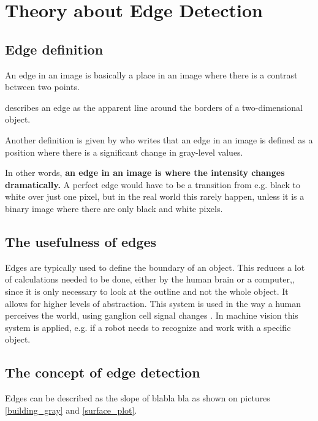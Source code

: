 \chapter{Theory about Edge Detection}
\section{Edge definition}
An edge in an image is basically a place in an image where there is a contrast between two points.

\citet{visual_story} describes an edge as the apparent line around the borders of a two-dimensional object.

Another definition is given by \citep{ip_book} who writes that an edge in an image is defined as a position where there is a significant change in gray-level values.

In other words, \textbf{an edge in an image is where the intensity changes dramatically.} A perfect edge would have to be a transition from e.g. black to white over just one pixel, but in the real world this rarely happen, unless it is a binary image where there are only black and white pixels.

\section{The usefulness of edges}
Edges are typically used to define the boundary of an object. This reduces a lot of calculations needed to be done, either by the human brain or a computer,, since it is only necessary to look at the outline and not the whole object. It allows for higher levels of abstraction. This system is used in the way a human perceives the world, using ganglion cell signal changes \citep{perception} . In machine vision this system is applied, e.g. if a robot needs to recognize and work with a specific object.

\section{The concept of edge detection}
Edges can be described as the slope of blabla bla as shown on pictures \ref{building_gray} and \ref{surface_plot}.

